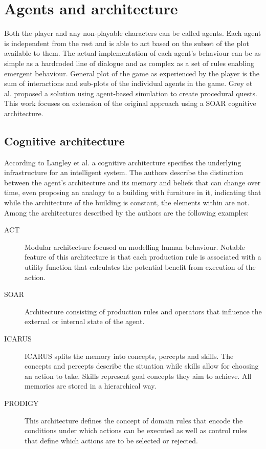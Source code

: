 
\section{Agents and architecture}

Both the player and any non-playable characters can be called agents.
Each agent is independent from the rest and is able to act based on the subset of the plot available to them.
The actual implementation of each agent's behaviour can be as simple as a hardcoded line of dialogue and as complex as a set of rules enabling emergent behaviour.
General plot of the game as experienced by the player is the sum of interactions and sub-plots of the individual agents in the game.
Grey et al.\cite{grey2011procedural} proposed a solution using agent-based simulation to create procedural quests.
This work focuses on extension of the original approach using a SOAR cognitive architecture\cite{rosenbloom1993soar}.

\subsection{Cognitive architecture}

According to Langley et al.\cite{langley2009cognitive} a cognitive architecture specifies the underlying infrastructure for an intelligent system.
The authors describe the distinction between the agent's architecture and its memory and beliefs that can change over time, even proposing an analogy to a building with furniture in it, indicating that while the architecture of the building is constant, the elements within are not.
Among the architectures described by the authors are the following examples:

\begin{description}
    \item[ACT] Modular architecture focused on modelling human behaviour. Notable feature of this architecture is that each production rule is associated with a utility function that calculates the potential benefit from execution of the action.
    \item[SOAR] Architecture consisting of production rules and operators that influence the external or internal state of the agent.
    \item[ICARUS] ICARUS splits the memory into concepts, percepts and skills. The concepts and percepts describe the situation while skills allow for choosing an action to take. Skills represent goal concepts they aim to achieve. All memories are stored in a hierarchical way.
    \item[PRODIGY] This architecture defines the concept of domain rules that encode the conditions under which actions can be executed as well as control rules that define which actions are to be selected or rejected.
\end{description}

